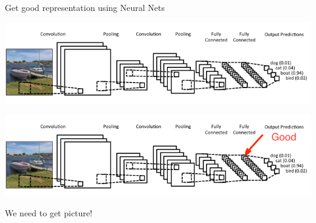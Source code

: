 \documentclass{beamer}
\begin{document}
\begin{frame}{Get good representation using Neural Nets}
	\begin{center}
		\includegraphics[scale=0.4]{img/cnn}
		
		\includegraphics[scale=0.4]{img/cnn_gr}
	\end{center}
	
	\begin{tcolorbox}[colback=gray!2, colframe=red!90, title=Problem]
		\centering We need to get picture!
	\end{tcolorbox}
\end{frame}
\end{document}
